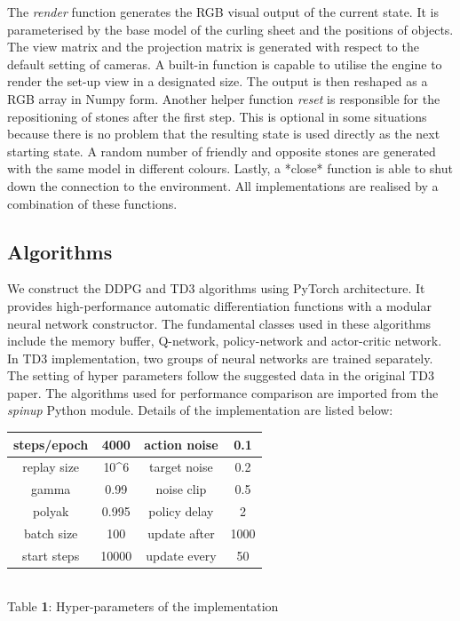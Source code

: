\documentclass[oneside,11pt,a4paper]{article}
\begin{document}
\newline
\newline
\noindent
The \textit{render} function generates the RGB visual output of the current state. It is parameterised by the base model of the curling sheet and the positions of objects. The view matrix and the projection matrix is generated with respect to the default setting of cameras. A built-in function is capable to utilise the engine to render the set-up view in a designated size. The output is then reshaped as a RGB array in Numpy form.
\newline
\newline
\noindent
Another helper function \textit{reset} is responsible for the repositioning of stones after the first step. This is optional in some situations because there is no problem that the resulting state is used directly as the next starting state. A random number of friendly and opposite stones are generated with the same model in different colours. Lastly, a *close* function is able to shut down the connection to the environment. All implementations are realised by a combination of these functions.
\newline
\newline
\noindent
\subsection{Algorithms}
We construct the DDPG and TD3 algorithms using PyTorch architecture. It provides high-performance automatic differentiation functions with a modular neural network constructor. The fundamental classes used in these algorithms include the memory buffer, Q-network, policy-network and actor-critic network. In TD3 implementation, two groups of neural networks are trained separately. The setting of hyper parameters follow the suggested data in the original TD3 paper. The algorithms used for performance comparison are imported from the \textit{spinup }Python module. Details of the implementation are listed below:
\vspace{1.5cm}
\begin{center}
    \begin{tabular}{|c|c|c|c|}
    \hline
    steps/epoch & 4000 & action noise & 0.1 \\
    \hline
    replay size & 10\^{}6 & target noise & 0.2 \\
    \hline
    gamma & 0.99 & noise clip & 0.5 \\
    \hline
    polyak & 0.995 & policy delay & 2 \\
    \hline
    batch size & 100 & update after & 1000 \\
    \hline
    start steps & 10000 & update every & 50 \\
    \hline
\end{tabular}
\vspace{0.5cm}
\\ Table \textbf{1}: Hyper-parameters of the implementation
\end{center}
\end{document}
